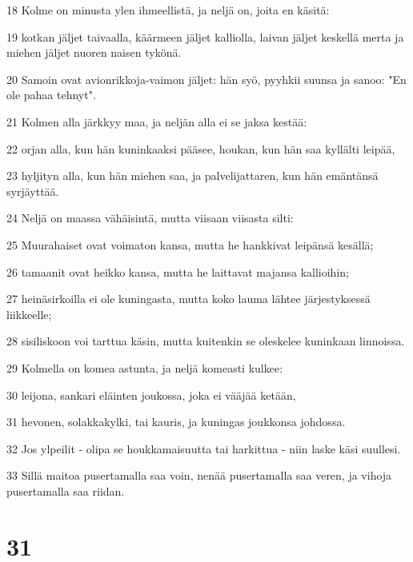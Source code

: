 \par 18 Kolme on minusta ylen ihmeellistä, ja neljä on, joita en käsitä:
\par 19 kotkan jäljet taivaalla, käärmeen jäljet kalliolla, laivan jäljet keskellä merta ja miehen jäljet nuoren naisen tykönä.
\par 20 Samoin ovat avionrikkoja-vaimon jäljet: hän syö, pyyhkii suunsa ja sanoo: "En ole pahaa tehnyt".
\par 21 Kolmen alla järkkyy maa, ja neljän alla ei se jaksa kestää:
\par 22 orjan alla, kun hän kuninkaaksi pääsee, houkan, kun hän saa kyllälti leipää,
\par 23 hyljityn alla, kun hän miehen saa, ja palvelijattaren, kun hän emäntänsä syrjäyttää.
\par 24 Neljä on maassa vähäisintä, mutta viisaan viisasta silti:
\par 25 Muurahaiset ovat voimaton kansa, mutta he hankkivat leipänsä kesällä;
\par 26 tamaanit ovat heikko kansa, mutta he laittavat majansa kallioihin;
\par 27 heinäsirkoilla ei ole kuningasta, mutta koko lauma lähtee järjestyksessä liikkeelle;
\par 28 sisiliskoon voi tarttua käsin, mutta kuitenkin se oleskelee kuninkaan linnoissa.
\par 29 Kolmella on komea astunta, ja neljä komeasti kulkee:
\par 30 leijona, sankari eläinten joukossa, joka ei vääjää ketään,
\par 31 hevonen, solakkakylki, tai kauris, ja kuningas joukkonsa johdossa.
\par 32 Jos ylpeilit - olipa se houkkamaisuutta tai harkittua - niin laske käsi suullesi.
\par 33 Sillä maitoa pusertamalla saa voin, nenää pusertamalla saa veren, ja vihoja pusertamalla saa riidan.

\chapter{31}

